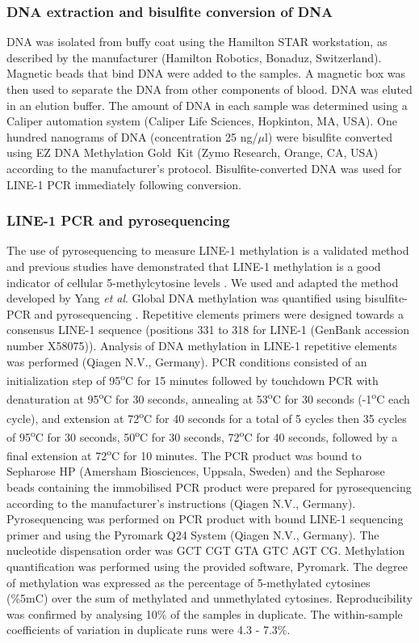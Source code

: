 \subsubsection{DNA extraction and bisulfite conversion of DNA} %
\noindent DNA was isolated from buffy coat using the Hamilton STAR workstation, as described by the manufacturer (Hamilton Robotics, Bonaduz, Switzerland). Magnetic beads that bind DNA were added to the samples. A magnetic box was then used to separate the DNA from other components of blood. DNA was eluted in an elution buffer. The amount of DNA in each sample was determined using a Caliper automation system (Caliper Life Sciences, Hopkinton, MA, USA). One hundred nanograms of DNA (concentration 25 ng/$\mu$l) were bisulfite converted using EZ DNA Methylation Gold\texttrademark~Kit (Zymo Research, Orange, CA, USA) according to the manufacturer's protocol. Bisulfite-converted DNA was used for LINE-1 PCR immediately following conversion. 

\subsubsection{LINE-1 PCR and pyrosequencing} %
\noindent The use of pyrosequencing to measure LINE-1 methylation is a validated method and previous studies have demonstrated that LINE-1 methylation is a good indicator of cellular 5-methylcytosine levels \cite{c56}. We used and adapted the method developed by Yang \emph{et al}. Global DNA methylation was quantified using bisulfite-PCR and pyrosequencing \cite{c56}. Repetitive elements primers were designed towards a consensus LINE-1 sequence (positions 331 to 318 for LINE-1 (GenBank accession number X58075)). Analysis of DNA methylation in LINE-1 repetitive elements was performed (Qiagen N.V., Germany). PCR conditions consisted of an initialization step of 95\textsuperscript{o}C for 15 minutes followed by touchdown PCR with denaturation at 95\textsuperscript{o}C for 30 seconds, annealing at 53\textsuperscript{o}C for 30 seconds (-1\textsuperscript{o}C each cycle), and extension at 72\textsuperscript{o}C for 40 seconds for a total of 5 cycles then 35 cycles of 95\textsuperscript{o}C for 30 seconds, 50\textsuperscript{o}C for 30 seconds, 72\textsuperscript{o}C for 40 seconds, followed by a final extension at 72\textsuperscript{o}C for 10 minutes. The PCR product was bound to Sepharose HP (Amersham Biosciences, Uppsala, Sweden) and the Sepharose beads containing the immobilised PCR product were prepared for pyrosequencing according to the manufacturer's instructions (Qiagen N.V., Germany). Pyrosequencing was performed on PCR product with bound LINE-1 sequencing primer and using the Pyromark Q24 System (Qiagen N.V., Germany). The nucleotide dispensation order was GCT CGT GTA GTC AGT CG. Methylation quantification was performed using the provided software, Pyromark. The degree of methylation was expressed as the percentage of 5-methylated cytosines (\%5mC) over the sum of methylated and unmethylated cytosines. Reproducibility was confirmed by analysing 10\% of the samples in duplicate. The within-sample coefficients of variation in duplicate runs were 4.3 - 7.3\%.

